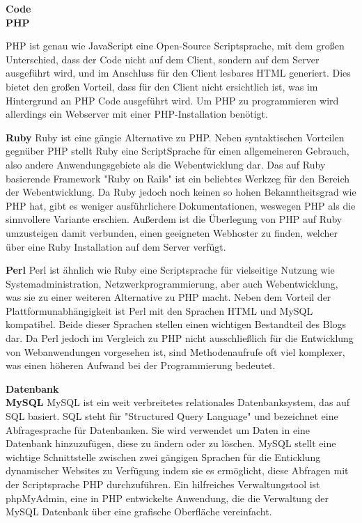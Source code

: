     \textbf{Code}\\
    \textbf{PHP}
    {PHP\cite{php} ist genau wie JavaScript eine Open-Source Scriptsprache, mit dem großen Unterschied, dass der Code nicht auf dem Client, sondern auf dem Server ausgeführt wird,
    und im Anschluss für den Client lesbares HTML generiert. Dies bietet den großen Vorteil, dass für den Client nicht ersichtlich ist, was im Hintergrund an PHP Code ausgeführt
    wird. Um PHP zu programmieren wird allerdings ein Webserver mit einer PHP-Installation benötigt.

    \textbf{Ruby}
    {Ruby\cite{ruby}} ist eine gängie Alternative zu PHP. Neben syntaktischen Vorteilen gegnüber PHP stellt Ruby eine ScriptSprache für einen allgemeineren Gebrauch,
    also andere Anwendungsgebiete als die Webentwicklung dar. Das auf Ruby basierende Framework "Ruby on Rails" ist ein beliebtes Werkzeg für den Bereich der Webentwicklung.
    Da Ruby jedoch noch keinen so hohen Bekanntheitsgrad wie PHP hat, gibt es weniger ausführlichere Dokumentationen, weswegen PHP als die sinnvollere Variante erschien.
    Außerdem ist die Überlegung von PHP auf Ruby umzusteigen damit verbunden, einen geeigneten Webhoster zu finden, welcher über eine Ruby Installation auf dem Server verfügt.

    \textbf{Perl}
    {Perl\cite{perl}} ist ähnlich wie Ruby eine Scriptsprache für vielseitige Nutzung wie Systemadministration, Netzwerkprogrammierung, aber auch Webentwicklung, was sie
    zu einer weiteren Alternative zu PHP macht. Neben dem Vorteil der Plattformunabhängigkeit ist Perl mit den Sprachen HTML und MySQL kompatibel. Beide dieser Sprachen stellen
    einen wichtigen Bestandteil des Blogs dar. Da Perl jedoch im Vergleich zu PHP nicht ausschließlich für die Entwicklung von Webanwendungen vorgesehen ist, sind
    Methodenaufrufe oft viel komplexer, was einen höheren Aufwand bei der Programmierung bedeutet.

    \textbf{Datenbank}\\
    \textbf{MySQL}
    MySQL ist ein weit verbreitetes relationales Datenbanksystem, das auf SQL basiert. SQL steht für "Structured Query Language" und bezeichnet eine Abfragesprache für Datenbanken.
    Sie wird verwendet um Daten in eine Datenbank hinzuzufügen, diese zu ändern oder zu löschen. MySQL stellt eine wichtige Schnittstelle zwischen zwei gängigen Sprachen für
    die Enticklung dynamischer Websites zu Verfügung indem sie es ermöglicht, diese Abfragen mit der Scriptsprache PHP durchzuführen. Ein hilfreiches Verwaltungstool ist phpMyAdmin,
    eine in PHP entwickelte Anwendung, die die Verwaltung der MySQL Datenbank über eine grafische Oberfläche vereinfacht.

}
